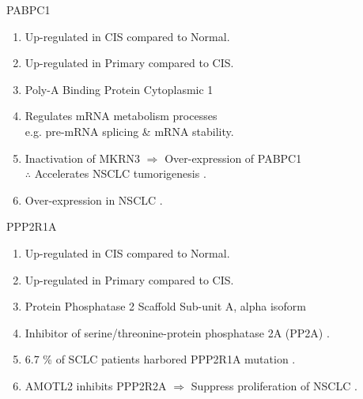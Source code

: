 \documentclass{beamer}
\begin{document}
\begin{frame}[allowframebreaks]
        \begin{block}{PABPC1}
            \begin{enumerate}
                \item Up-regulated in CIS compared to Normal.
                \item Up-regulated in Primary compared to CIS.
                \item Poly-A Binding Protein Cytoplasmic 1
                \item Regulates mRNA metabolism processes  \cite{PABPC1-1} \\
                    e.g. pre-mRNA splicing \& mRNA stability.
                \item Inactivation of MKRN3 $\Rightarrow$ Over-expression of PABPC1 \\
                    $\therefore$ Accelerates NSCLC tumorigenesis \cite{PABPC1-2}.
                \item Over-expression in NSCLC \cite{PABPC1-3}.
            \end{enumerate}
        \end{block}

        \begin{block}{PPP2R1A}
            \begin{enumerate}
               \item Up-regulated in CIS compared to Normal.
               \item Up-regulated in Primary compared to CIS.
               \item Protein Phosphatase 2 Scaffold Sub-unit A, alpha isoform
               \item Inhibitor of serine/threonine-protein phosphatase 2A (PP2A) \cite{PPP2R1A-1, PPP2R1A-2}.
               \item 6.7 \% of SCLC patients harbored PPP2R1A mutation \cite{PPP2R1A-3}.
               \item AMOTL2 inhibits PPP2R2A $\Rightarrow$ Suppress proliferation of NSCLC \cite{PPP2R1A-4}.
            \end{enumerate}
        \end{block}


\end{frame}
\end{document}

